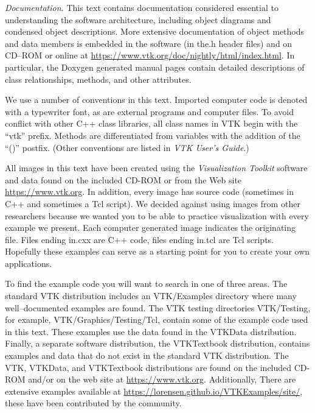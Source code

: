 \emph{Documentation.} This text contains documentation considered essential to understanding the software architecture, including object diagrams and condensed object descriptions. More extensive documentation of object methods and data members is embedded in the software (in the.h header files) and on CD--ROM or online at \href{https://www.vtk.org/doc/nightly/html/index.html}{https://www.vtk.org/doc/nightly/html/index.html}. In particular, the Doxygen generated manual pages contain detailed descriptions of class relationships, methods, and other attributes.

We use a number of conventions in this text. Imported computer code is denoted with a typewriter font, as are external programs and computer files. To avoid conflict with other C++ class libraries, all class names in VTK begin with the ``vtk'' prefix. Methods are differentiated from variables with the addition of the ``()'' postfix. (Other conventions are listed in \emph{VTK User's Guide}.)

All images in this text have been created using the \emph{Visualization Toolkit} software and data found on the included CD-ROM or from the Web site \href{https://www.vtk.org/}{https://www.vtk.org}. In addition, every image has source code (sometimes in C++ and sometimes a Tcl script). We decided against using images from other researchers because we wanted you to be able to practice visualization with every example we present. Each computer generated image indicates the originating file. Files ending in.cxx are C++ code, files ending in.tcl are Tcl scripts. Hopefully these examples can serve as a starting point for you to create your own applications.

To find the example code you will want to search in one of three areas. The standard VTK distribution includes an VTK/Examples directory where many well--documented examples are found. The VTK testing directories VTK/Testing, for example, VTK/Graphics/Testing/Tcl, contain some of the example code used in this text.  These examples use the data found in the VTKData distribution. Finally, a separate software distribution, the VTKTextbook distribution, contains examples and data that do not exist in the standard VTK distribution. The VTK, VTKData, and VTKTextbook distributions are found on the included CD-ROM and/or on the web site at \href{https://www.vtk.org/}{https://www.vtk.org}. Additionally, There are extensive examples available at \href{https://lorensen.github.io/VTKExamples/site/}{https://lorensen.github.io/VTKExamples/site/}, these have been contributed by the community.

